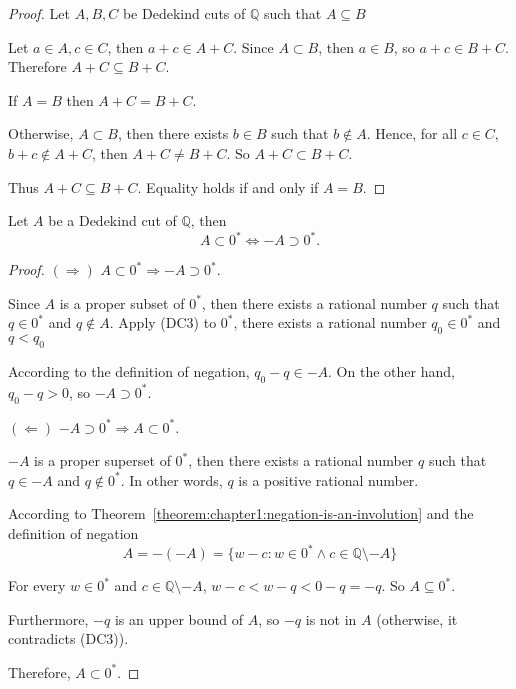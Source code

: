 \begin{proof}
    Let $A, B, C$ be Dedekind cuts of $\mathbb{Q}$ such that $A\subseteq B$

    Let $a\in A, c\in C$, then $a + c\in A + C$. Since $A\subset B$, then $a\in B$, so $a + c\in B + C$. Therefore $A + C\subseteq B + C$.

    If $A = B$ then $A + C = B + C$.

    Otherwise, $A\subset B$, then there exists $b\in B$ such that $b\notin A$. Hence, for all $c\in C$, $b + c\notin A + C$, then $A + C\ne B + C$. So $A + C\subset B + C$.

    Thus $A + C\subseteq B + C$. Equality holds if and only if $A = B$.
\end{proof}

\begin{theorem}\label{theorem:chapter1:negation-and-sign}
    Let $A$ be a Dedekind cut of $\mathbb{Q}$, then
    \[
        A\subset {0}^{*} \Longleftrightarrow -A\supset {0}^{*}.
    \]
\end{theorem}

\begin{proof}
    $(\Rightarrow)$ $A\subset {0}^{*}\Longrightarrow -A\supset {0}^{*}$.

    Since $A$ is a proper subset of ${0}^{*}$, then there exists a rational number $q$ such that $q\in {0}^{*}$ and $q\notin A$. Apply (DC3) to ${0}^{*}$, there exists a rational number $q_{0}\in {0}^{*}$ and $q < q_{0}$

    According to the definition of negation, $q_{0} - q\in -A$. On the other hand, $q_{0} - q > 0$, so $-A \supset {0}^{*}$.

    \bigskip
    $(\Leftarrow)$ $-A\supset {0}^{*}\Longrightarrow A\subset {0}^{*}$.

    $-A$ is a proper superset of ${0}^{*}$, then there exists a rational number $q$ such that $q\in -A$ and $q\notin {0}^{*}$. In other words, $q$ is a positive rational number.

    According to Theorem~\ref{theorem:chapter1:negation-is-an-involution} and the definition of negation
    \[
        A = -(-A) = \{ w - c : w\in {0}^{*}\land c\in\mathbb{Q}\setminus -A \}
    \]

    For every $w\in {0}^{*}$ and $c\in\mathbb{Q}\setminus - A$, $w - c < w - q < 0 - q = -q$. So $A\subseteq {0}^{*}$.

    Furthermore, $-q$ is an upper bound of $A$, so $-q$ is not in $A$ (otherwise, it contradicts (DC3)).

    Therefore, $A\subset {0}^{*}$.
\end{proof}

